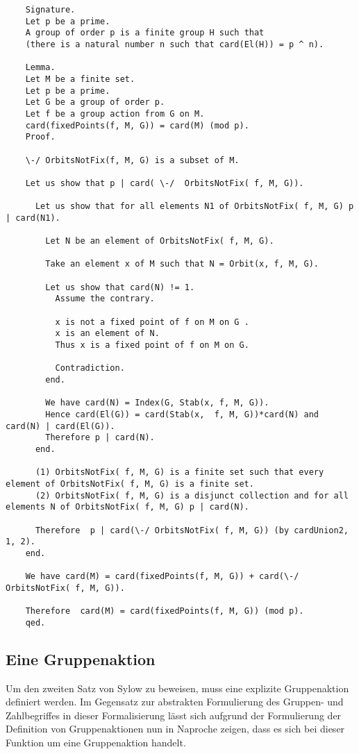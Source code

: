 \documentclass[a4paper,12pt]{scrartcl}
\begin{document}
\begin{lstlisting}
	Signature.
	Let p be a prime.
	A group of order p is a finite group H such that
	(there is a natural number n such that card(El(H)) = p ^ n).
	
	Lemma.
	Let M be a finite set.
	Let p be a prime.
	Let G be a group of order p.
	Let f be a group action from G on M.
	card(fixedPoints(f, M, G)) = card(M) (mod p).
	Proof.
	
	\-/ OrbitsNotFix(f, M, G) is a subset of M.
	
	Let us show that p | card( \-/  OrbitsNotFix( f, M, G)).
	
	  Let us show that for all elements N1 of OrbitsNotFix( f, M, G) p | card(N1).
	
		Let N be an element of OrbitsNotFix( f, M, G).
	
		Take an element x of M such that N = Orbit(x, f, M, G).
		
		Let us show that card(N) != 1.
		  Assume the contrary.
		   
		  x is not a fixed point of f on M on G .
		  x is an element of N.
		  Thus x is a fixed point of f on M on G.
	
		  Contradiction.
		end.
	
		We have card(N) = Index(G, Stab(x, f, M, G)).
		Hence card(El(G)) = card(Stab(x,  f, M, G))*card(N) and card(N) | card(El(G)).
		Therefore p | card(N).
	  end.
	
	  (1) OrbitsNotFix( f, M, G) is a finite set such that every element of OrbitsNotFix( f, M, G) is a finite set.
	  (2) OrbitsNotFix( f, M, G) is a disjunct collection and for all elements N of OrbitsNotFix( f, M, G) p | card(N).
	
	  Therefore  p | card(\-/ OrbitsNotFix( f, M, G)) (by cardUnion2, 1, 2).
	end.
	
	We have card(M) = card(fixedPoints(f, M, G)) + card(\-/ OrbitsNotFix( f, M, G)).
	
	Therefore  card(M) = card(fixedPoints(f, M, G)) (mod p).
	qed.

\end{lstlisting}

\subsection{Eine Gruppenaktion}

Um den zweiten Satz von Sylow zu beweisen,  muss eine explizite Gruppenaktion definiert werden. Im Gegensatz zur abstrakten Formulierung des Gruppen- und Zahlbegriffes in dieser Formalisierung lässt sich aufgrund der Formulierung der Definition von Gruppenaktionen nun in Naproche zeigen, dass es sich bei dieser Funktion um eine Gruppenaktion handelt.
\end{document}
